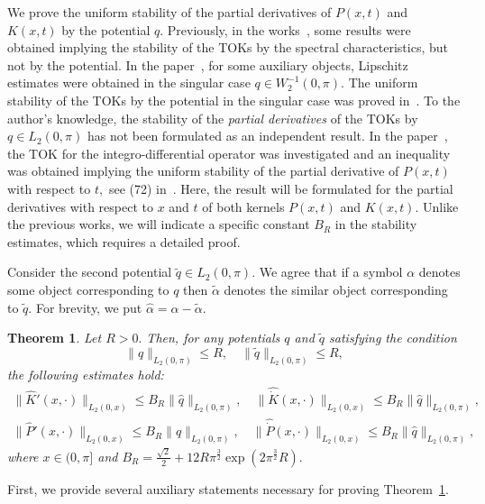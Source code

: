 \documentclass[a4paper, 12pt] {article}
\theoremstyle{plain}
\newtheorem{theorem}{\indent Theorem}
\theoremstyle{remark}
\theoremstyle{plain}
\theoremstyle{definition}
\numberwithin{equation}{section}
\begin{document}
We prove the uniform stability of the partial derivatives of $P(x, t)$ and $K(x, t)$  by the potential $q.$
Previously, in the works~\cite{march,hrynivIP}, some results were obtained implying the stability of the TOKs by the spectral characteristics, but not by the potential.
In the paper~\cite{hryniv}, for some auxiliary objects, Lipschitz estimates were obtained in the singular case $q \in W^{-1}_2(0, \pi).$
The uniform stability of the TOKs by the potential in the singular case was proved in~\cite{tree}.  
To the author's knowledge, the stability of the {\it partial derivatives} of the TOKs by $q \in L_2(0, \pi)$ has not been formulated as an independent result. In the paper~\cite{but diff}, the TOK for the integro-differential operator was investigated and an inequality was obtained implying the uniform stability of the partial derivative of $P(x, t)$ with respect to $t,$ see (72) in~\cite{but diff}. 
Here, the result will be formulated for the partial derivatives with respect to $x$ and $t$ of both kernels $P(x, t)$ and $K(x, t).$ Unlike the previous works, we will indicate a specific constant $B_R$ in the stability estimates, which requires a detailed proof.

Consider the second potential $\tilde q \in L_2(0, \pi).$ We agree that if a symbol $\alpha$ denotes some object corresponding to $q$ then $\tilde \alpha$ denotes the similar object corresponding to $\tilde q.$
For brevity, we put $\hat \alpha = \alpha - \tilde \alpha.$

\begin{theorem} \label{trans stab}
Let $R>0.$ Then, for any potentials $q$ and $\tilde q$ satisfying the condition
$$\| q\|_{L_2(0, \pi)} \le R, \quad \| \tilde q \|_{L_2(0, \pi)}\le R,$$
 the following estimates hold:
\begin{equation} \label{K stability}
\begin{split} 
\| \hat K'(x, \cdot)\|_{L_2(0, x)} \le B_R \| \hat q\|_{L_2(0, \pi)}, \quad \| \hat{\dot{K}}(x, \cdot)\|_{L_2(0, x)} \le B_R \| \hat q\|_{L_2(0, \pi)},
\\ 
\| \hat P'(x, \cdot)\|_{L_2(0, x)} \le B_R \| \hat q\|_{L_2(0, \pi)}, \quad \| \hat{\dot {P}}(x, \cdot)\|_{L_2(0, x)} \le B_R \| \hat q\|_{L_2(0, \pi)}, 
\end{split} 
\end{equation}
where $x \in (0, \pi]$ and $B_R = \frac{\sqrt 2}{2} + 12R \pi^{\frac32}\exp(2\pi^{\frac32}R).$
\end{theorem}

First, we provide several auxiliary statements necessary for proving Theorem~\ref{trans stab}.
\end{document}

